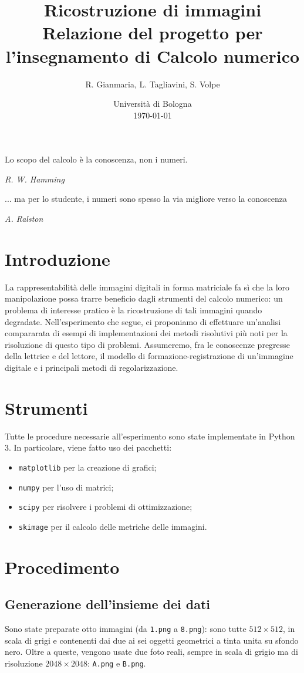 \documentclass[a4paper]{article}
\title{
  Ricostruzione di immagini \\ \large Relazione del progetto per
  l'insegnamento di Calcolo numerico
}
\author{
  R. Gianmaria,
  L. Tagliavini,
  S. Volpe
}
\date{
	Universit\`a di Bologna \\
  \today
}
\begin{document}
\maketitle
\thispagestyle{empty}

\pagebreak
\tableofcontents
\pagebreak

\epigraph{Lo scopo del calcolo è la conoscenza, non i numeri.}
{\textit{R. W. Hamming}}
\epigraph{... ma per lo studente, i numeri sono spesso la via migliore verso la
conoscenza}
{\textit{A. Ralston}}

\section{Introduzione}
La rappresentabilità delle immagini digitali in forma matriciale fa sì che la
loro manipolazione possa trarre beneficio dagli strumenti del calcolo numerico:
un problema di interesse pratico è la ricostruzione di tali immagini quando
degradate. Nell'esperimento che segue, ci proponiamo di effettuare un'analisi
compararata di esempi di implementazioni dei metodi risolutivi più noti per la
risoluzione di questo tipo di problemi. Assumeremo, fra le conoscenze pregresse
della lettrice e del lettore, il modello di formazione-registrazione di
un'immagine digitale e i principali metodi di regolarizzazione.

\section{Strumenti}
Tutte le procedure necessarie all'esperimento sono state implementate in Python
3. In particolare, viene fatto uso dei pacchetti:
\begin{itemize}
  \item \verb!matplotlib! per la creazione di grafici;
  \item \verb!numpy! per l'uso di matrici;
  \item \verb!scipy! per risolvere i problemi di ottimizzazione;
  \item \verb!skimage! per il calcolo delle metriche delle immagini.
\end{itemize}

\section{Procedimento}

\subsection{Generazione dell'insieme dei dati}
Sono state preparate otto immagini (da \verb!1.png! a \verb!8.png!): sono tutte
$512 \times 512$, in scala di grigi e contenenti dai due ai sei oggetti
geometrici a tinta unita su sfondo nero. Oltre a queste, vengono usate due foto
reali, sempre in scala di grigio ma di risoluzione $2048 \times 2048$:
\verb!A.png! e \verb!B.png!.
\end{document}

